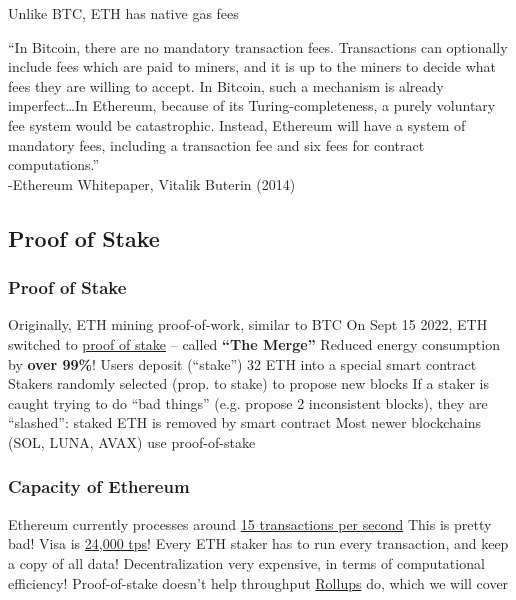 \documentclass[aspectratio=169]{beamer}
\begin{document}
\begin{frame}{Unlike BTC, ETH has native gas fees}

``In Bitcoin, there are no mandatory transaction fees. Transactions can optionally include fees which are paid to miners, and it is up to the miners to decide what fees they are willing to accept. In Bitcoin, such a mechanism is already imperfect\ldots In Ethereum, because of its Turing-completeness, a purely voluntary fee system would be catastrophic. Instead, Ethereum will have a system of mandatory fees, including a transaction fee and six fees for contract computations.'' \\

-Ethereum Whitepaper, Vitalik Buterin (2014)
    
\end{frame}




\subsection{Proof of Stake}

\begin{frame}
\frametitle{Proof of Stake}

\bi
\m Originally, ETH mining proof-of-work, similar to BTC
\m On Sept 15 2022, ETH switched to \ul{proof of stake} -- called \textbf{``The Merge''}
\m Reduced energy consumption by \textbf{over 99\%}! 
\m Users deposit (``stake'') 32 ETH into a special smart contract
\m Stakers randomly selected (prop. to stake) to propose new blocks
\m If a staker is caught trying to do ``bad things'' (e.g. propose 2 inconsistent blocks), they are ``slashed'': staked ETH is removed by smart contract
\m Most newer blockchains (SOL, LUNA, AVAX) use proof-of-stake
\ei

\end{frame}

\begin{frame}
\frametitle{Capacity of Ethereum}

\bi
\m Ethereum currently processes around \href{https://www.coinbase.com/blog/scaling-ethereum-crypto-for-a-billion-users}{15 transactions per second}
\m This is pretty bad! Visa is \href{https://crypto.com/university/blockchain-scalability}{24,000 tps}!
\bi
\m Every ETH staker has to run every transaction, and keep a copy of all data!
\ei
\m Decentralization very expensive, in terms of computational efficiency!
\m Proof-of-stake doesn't help throughput
\bi 
\m \ul{Rollups} do, which we will cover 
\ei 
\ei

\end{frame}
\end{document}
